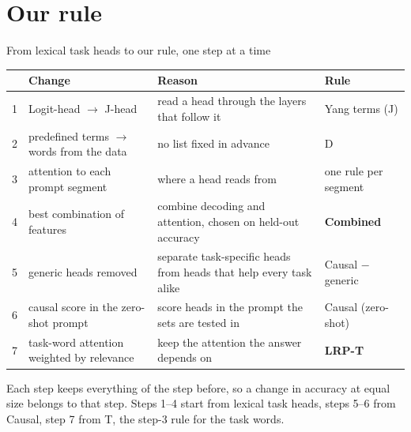 \documentclass[aspectratio=169,11pt,xcolor=table]{beamer}
\newcommand{\Sel}{\textcolor{cSel}{\textbf{Combined}}}
\newcommand{\Causal}{\textcolor{cCaus}{Causal}}
\newcommand{\CausalG}{\textcolor{cCausG}{Causal $-$ generic}}
\newcommand{\LRPT}{\textcolor{cLRP}{\textbf{LRP-T}}}
\begin{document}
\section{Our rule}

\begin{frame}{From lexical task heads to our rule, one step at a time}
\centering\footnotesize
\begin{tabular}{@{}cl>{\raggedright\arraybackslash}p{4.6cm}l@{}}
\toprule
 & Change & Reason & Rule \\
\midrule
1 & Logit-head $\to$ J-head & read a head through the layers that follow it & \textcolor{cYangJ}{Yang terms (J)} \\[2pt]
2 & predefined terms $\to$ words from the data & no list fixed in advance & \textcolor{cD}{D} \\[2pt]
3 & attention to each prompt segment & where a head reads from & one rule per segment \\[2pt]
4 & best combination of features & combine decoding and attention, chosen on held-out accuracy & \Sel \\[2pt]
5 & generic heads removed & separate task-specific heads from heads that help every task alike & \CausalG \\[2pt]
6 & causal score in the zero-shot prompt & score heads in the prompt the sets are tested in & Causal (zero-shot) \\[2pt]
7 & task-word attention weighted by relevance & keep the attention the answer depends on & \LRPT \\
\bottomrule
\end{tabular}

\vspace{1em}
\raggedright
Each step keeps everything of the step before, so a change in accuracy at equal size
belongs to that step. Steps 1--4 start from lexical task heads, steps 5--6 from \Causal,
step 7 from T, the step-3 rule for the task words.
\end{frame}
\end{document}

